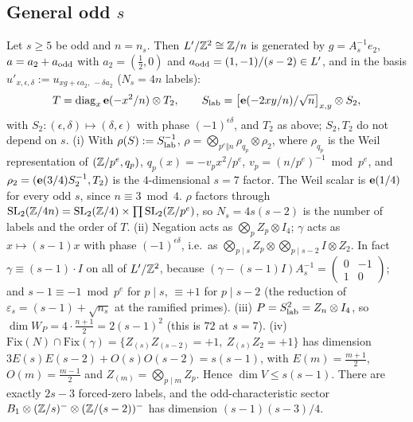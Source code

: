 \subsection{General odd $s$}
\begin{theorem}\label{thm:tensorodd}
Let $s\ge5$ be odd and $n=n_s$. Then $L'/\mathbb{Z}^2\cong\mathbb{Z}/n$ is generated by $g=A_s^{-1}e_2$, $a=a_2+a_{\rm odd}$ with $a_2=(\tfrac12,0)$ and
$a_{\rm odd}=(1,-1)/(s-2)\in L'$, and in the basis $u'_{x,\epsilon,\delta}:=u_{xg+\epsilon a_2,\,-\delta a_2}$ ($N_s=4n$ labels):
\[
T=\mathrm{diag}_x\,\mathbf{e}(-x^2/n)\otimes T_2,\qquad S_{\rm lab}=\bigl[\mathbf{e}(-2xy/n)/\sqrt n\bigr]_{x,y}\otimes S_2,
\]
with $S_2:(\epsilon,\delta)\mapsto(\delta,\epsilon)$ with phase $(-1)^{\epsilon\delta}$, and $T_2$ as above; $S_2,T_2$ do not depend on $s$.
(i) With $\rho(S):=S_{\rm lab}^{-1}$, $\rho=\bigotimes_{p^e\Vert n}\rho_{q_p}\otimes\rho_2$, where $\rho_{q_p}$ is the Weil representation of $(\mathbb{Z}/p^e,q_p)$,
$q_p(x)=-v_px^2/p^e$, $v_p=(n/p^e)^{-1}\bmod p^e$, and $\rho_2=(\mathbf{e}(3/4)S_2^{-1},T_2)$ is the $4$-dimensional $s=7$ factor. The Weil scalar is $\mathbf{e}(1/4)$ for every odd $s$, since
$n\equiv3\bmod4$. $\rho$ factors through $\mathrm{SL}_2(\mathbb{Z}/4n)=\mathrm{SL}_2(\mathbb{Z}/4)\times\prod\mathrm{SL}_2(\mathbb{Z}/p^e)$, so $N_s=4s(s-2)$ is the number of labels and the order of $T$.
(ii) Negation acts as $\bigotimes_pZ_p\otimes I_4$; $\gamma$ acts as $x\mapsto(s-1)x$ with phase $(-1)^{\epsilon\delta}$, i.e.\ as
$\bigotimes_{p\mid s}Z_p\otimes\bigotimes_{p\mid s-2}I\otimes Z_2$. In fact $\gamma\equiv(s-1)\cdot I$ on all of $L'/\mathbb{Z}^2$, because
$(\gamma-(s-1)I)A_s^{-1}=\begin{pmatrix}0&-1\\1&0\end{pmatrix}$; and $s-1\equiv-1\bmod p^e$ for $p\mid s$, $\equiv+1$ for $p\mid s-2$ (the reduction of
$\varepsilon_s=(s-1)+\sqrt{n_s}$ at the ramified primes).
(iii) $P=S_{\rm lab}^2=Z_n\otimes I_4$, so $\dim W_P=4\cdot\tfrac{n+1}2=2(s-1)^2$ (this is $72$ at $s=7$).
(iv) $\mathrm{Fix}(N)\cap\mathrm{Fix}(\gamma)=\{Z_{(s)}Z_{(s-2)}=+1,\ Z_{(s)}Z_2=+1\}$ has dimension $3E(s)E(s-2)+O(s)O(s-2)=s(s-1)$, with $E(m)=\tfrac{m+1}2$,
$O(m)=\tfrac{m-1}2$ and $Z_{(m)}=\bigotimes_{p\mid m}Z_p$. Hence $\dim V\le s(s-1)$. There are exactly $2s-3$ forced-zero labels, and the odd-characteristic
sector $B_1\otimes(\mathbb{Z}/s)^-\otimes(\mathbb{Z}/(s-2))^-$ has dimension $(s-1)(s-3)/4$.
\end{theorem}

